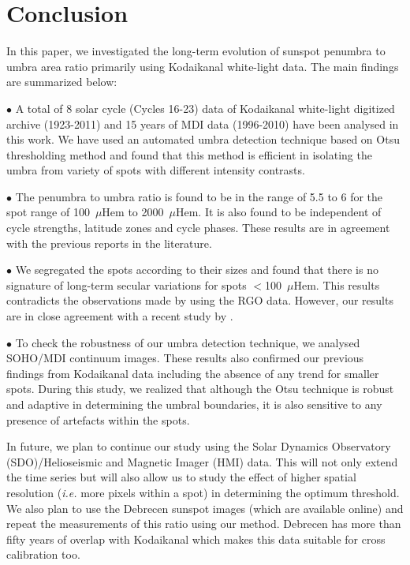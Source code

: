 \section{Conclusion}

In this paper, we investigated the long-term evolution of sunspot penumbra to umbra area ratio primarily using Kodaikanal white-light data. The main findings are summarized below:


$\bullet$ A total of 8 solar cycle (Cycles 16-23) data of Kodaikanal white-light digitized archive (1923-2011) and 15 years of MDI data (1996-2010) have been analysed in this work. We have used an automated umbra detection technique based on Otsu thresholding method and found that this method is efficient in isolating the umbra from variety of spots with different intensity contrasts.


$\bullet$ The penumbra to umbra ratio is found to be in the range of 5.5 to 6 for the spot range of 100~$\mu$Hem to 2000~$\mu$Hem. It is also found to be independent of cycle strengths, latitude zones and cycle phases. These results are in agreement with the previous reports in the literature.

$\bullet$ We segregated the spots according to their sizes and found that there is no signature of long-term secular variations for spots $<$100~$\mu$Hem. This results contradicts the observations made by \cite{Hathaway2013} using the RGO data. However, our results are in close agreement with a recent study by \cite{Carrasco2018}.

$\bullet$ To check the robustness of our umbra detection technique, we analysed SOHO/MDI continuum images. These results also confirmed our previous findings from Kodaikanal data including the absence of any trend for smaller spots. During this study, we realized that although the Otsu technique is robust and adaptive in determining the umbral boundaries, it is also sensitive to any presence of artefacts within the spots.


In future, we plan to continue our study using the Solar Dynamics Observatory (SDO)/Helioseismic and Magnetic Imager (HMI) \citep{Schou2012} data. This will not only extend the time series but will also allow us to study the effect of higher spatial resolution ({\it i.e.} more pixels within a spot) in determining the optimum threshold. We also plan to use the Debrecen sunspot images (which are available online) and repeat the measurements of this ratio using our method. Debrecen has more than fifty years of overlap with Kodaikanal which makes this data suitable for cross calibration too.



